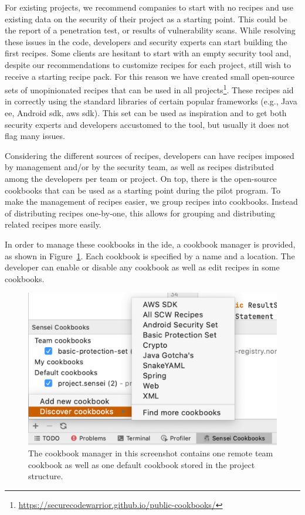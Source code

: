 For existing projects, we recommend companies to start with no recipes and use existing data on the security of their project as a starting point.
This could be the report of a penetration test, or results of vulnerability scans.
While resolving these issues in the code, developers and security experts can start building the first recipes.
Some clients are hesitant to start with an empty security tool and, despite our recommendations to customize recipes for each project, still wish to receive a starting recipe pack.
For this reason we have created small open-source sets of unopinionated recipes that can be used in all projects\footnote{\url{https://securecodewarrior.github.io/public-cookbooks/}}.
These recipes aid in correctly using the standard libraries of certain popular frameworks (e.g., Java 
\gls{ee}, Android \gls{sdk}, \gls{aws} \gls{sdk}).
This set can be used as inspiration and to get both security experts and developers accustomed to the tool, but usually it does not flag many issues.

Considering the different sources of recipes, developers can have recipes imposed by management and/or by the security team, as well as recipes distributed among the developers per team or project.
On top, there is the open-source cookbooks that can be used as a starting point during the pilot program.
To make the management of recipes easier, we group recipes into cookbooks.
Instead of distributing recipes one-by-one, this allows for grouping and distributing related recipes more easily. 

In order to manage these cookbooks in the \gls{ide}, a cookbook manager is provided, as shown in Figure~\ref{fig:cookbookmanager}.
Each cookbook is specified by a name and a location.
The developer can enable or disable any cookbook as well as edit recipes in some cookbooks.

\begin{figure}
  \centering
  \includegraphics[width=\textwidth,page=3]{04-tools/figures/figures1.pdf}
  \caption[Cookbook manager]{The cookbook manager in this screenshot contains one remote team cookbook as well as one default cookbook stored in the project structure.}
  \label{fig:cookbookmanager} 
\end{figure}

